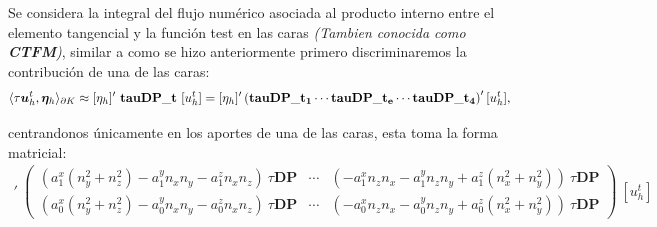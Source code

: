 \documentclass{article}
\begin{document}
\noindent Se considera la integral del flujo numérico asociada al producto interno entre el elemento tangencial y la función test en las caras \textit{(Tambien conocida como \textbf{CTFM})}, similar a como se hizo anteriormente primero discriminaremos la contribución de una de las caras:
\begin{equation*}
    \langle \tau\boldsymbol{u}_h^t, \boldsymbol{\eta}_h \rangle_{\partial K} \approx [\eta_h]'~\mathbf{tauDP\_t}~[u_h^t]
    = [\eta_h]' \left ( \mathbf{tauDP\_t_1} \cdots \mathbf{tauDP\_t_e} \cdots \mathbf{tauDP\_t_4} \right )' [u_h^t],
\end{equation*}

\noindent centrandonos únicamente en los aportes de una de las caras, esta toma la forma matricial:
\begin{align*}
    [\eta_h]'~ \left (
    \begin{array}{ccc}
     	( a_{1}^x (n_y^2 + n_z^2) -a_{1}^y n_x n_y - a_{1}^z n_x n_z )~\tau \mathbf{DP} &
        \cdots &
        ( -a_{1}^x n_z n_x  - a_{1}^y n_z n_y + a_{1}^z (n_x^2 + n_y^2) )~\tau \mathbf{DP} \\
        ( a_{0}^x (n_y^2 + n_z^2) -a_{0}^y n_x n_y - a_{0}^z n_x n_z )~\tau \mathbf{DP} &
        \cdots &
        ( -a_{0}^x n_z n_x  - a_{0}^y n_z n_y + a_{0}^z (n_x^2 + n_y^2) )~\tau \mathbf{DP}
    \end{array}
    \right )~[u_h^t]
\end{align*}

\end{document}
